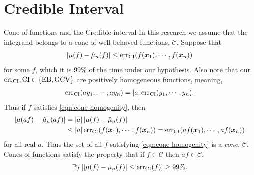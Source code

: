 \documentclass[handout, 10pt,compress,xcolor={usenames,dvipsnames}]{beamer} %
\newcommand{\MLE}{\textup{EB}}
\newcommand{\GCV}{\textup{GCV}}
\newcommand{\CI}{\textup{CI}}
\newcommand{\err}{{\text{err}}}
\def\abs#1{\ensuremath{\left \lvert #1 \right \rvert}}
\begin{document}
\section{Credible Interval}



\begin{frame}{Cone of functions and the Credible interval}
	In this research we assume that the integrand belongs to a cone of well-behaved functions, ${\mathscr{C}}$.  
	Suppose that 
	\begin{align}
	\label{eqn:cone-homogenity}
	\abs{\mu(f) - \hmu_n(f)} \le \err_{\CI} (f(\vx_1), \cdots, f(\vx_n))
	\end{align}
	for some $f$, which it is 99\% of the time under our hypothesis. Also note that our $\err_{\CI}, \CI \in \{\MLE, \GCV\}$  %
	are positively homogeneous functions, meaning, 
	\begin{align*}
	\err_{\CI} (a y_1, \cdots, a y_n) = \abs{a} \err_{\CI} ( y_1, \cdots,  y_n).
	\end{align*}
	Thus if $f$ satisfies \eqref{eqn:cone-homogenity}, then
	\begin{align*}
	\abs{\mu(af) - \hmu_n(af)} &= \abs{a} \abs{\mu(f) - \hmu_n(f)} \\
	& \le \abs{a} \err_{\textup{CI}} (f(\vx_1), \cdots, f(\vx_n) ) 
	= \err_{\textup{CI}} (a f(\vx_1), \cdots, a f(\vx_n))
	\end{align*}
	for all real $a$. Thus the set of all $f$ satisfying \eqref{eqn:cone-homogenity} is a \emph{cone}, $\mathscr{C}$. Cones of functions satisfy the property that if $f \in \mathscr{C}$ then $af \in \mathscr{C}$.
	\begin{align*}
	\mathbb{P}_f \left[
	|\mu(f)-\hmu_n(f)| \leq \err_{\CI}(f) \right] \ge 99\%.
	\end{align*}
\end{frame}
\end{document}
